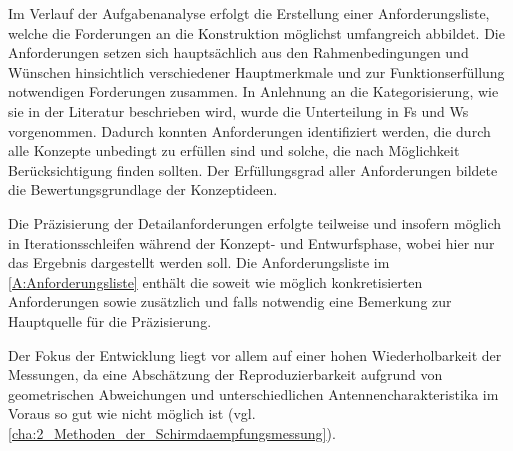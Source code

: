 


Im Verlauf der Aufgabenanalyse erfolgt die Erstellung einer Anforderungsliste, welche die Forderungen an die Konstruktion möglichst umfangreich abbildet. Die Anforderungen setzen sich hauptsächlich aus den Rahmenbedingungen und Wünschen hinsichtlich verschiedener Hauptmerkmale und zur Funktionserfüllung notwendigen Forderungen zusammen. In Anlehnung an die Kategorisierung, wie sie in der Literatur beschrieben wird, wurde die Unterteilung in \acp{F} und \acp{W} vorgenommen. Dadurch konnten Anforderungen identifiziert werden, die durch alle Konzepte unbedingt zu erfüllen sind und solche, die nach Möglichkeit Berücksichtigung finden sollten. Der Erfüllungsgrad aller Anforderungen bildete die Bewertungsgrundlage der Konzeptideen.
\par
\vspace{\linespace}
Die Präzisierung der Detailanforderungen erfolgte teilweise und insofern möglich in Iterationsschleifen während der Konzept- und Entwurfsphase, wobei hier nur das Ergebnis dargestellt werden soll. Die Anforderungsliste im \Anhang\ref{A:Anforderungsliste} enthält die soweit wie möglich konkretisierten Anforderungen sowie zusätzlich und falls notwendig eine Bemerkung zur Hauptquelle für die Präzisierung.
\par
\vspace{\linespace}
Der Fokus der Entwicklung liegt vor allem auf einer hohen Wiederholbarkeit der Messungen, da eine Abschätzung der Reproduzierbarkeit aufgrund von geometrischen Abweichungen und unterschiedlichen Antennencharakteristika im Voraus so gut wie nicht möglich ist (vgl. \Abschnitt\ref{cha:2_Methoden_der_Schirmdaempfungsmessung}).






